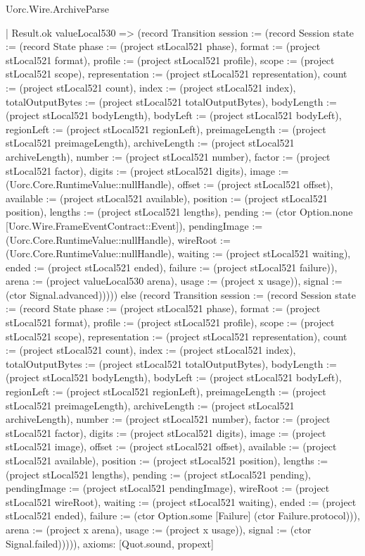 \begin{lexlean}{Uorc.Wire.ArchiveParse}
\begin{semanticmodule}
{      | Result.ok valueLocal530 => (record Transition {session := (record Session {state := (record State {phase := (project stLocal521 phase), format := (project stLocal521 format), profile := (project stLocal521 profile), scope := (project stLocal521 scope), representation := (project stLocal521 representation), count := (project stLocal521 count), index := (project stLocal521 index), totalOutputBytes := (project stLocal521 totalOutputBytes), bodyLength := (project stLocal521 bodyLength), bodyLeft := (project stLocal521 bodyLeft), regionLeft := (project stLocal521 regionLeft), preimageLength := (project stLocal521 preimageLength), archiveLength := (project stLocal521 archiveLength), number := (project stLocal521 number), factor := (project stLocal521 factor), digits := (project stLocal521 digits), image := (Uorc.Core.RuntimeValue::nullHandle), offset := (project stLocal521 offset), available := (project stLocal521 available), position := (project stLocal521 position), lengths := (project stLocal521 lengths), pending := (ctor Option.none [Uorc.Wire.FrameEventContract::Event]), pendingImage := (Uorc.Core.RuntimeValue::nullHandle), wireRoot := (Uorc.Core.RuntimeValue::nullHandle), waiting := (project stLocal521 waiting), ended := (project stLocal521 ended), failure := (project stLocal521 failure)}), arena := (project valueLocal530 arena), usage := (project x usage)}), signal := (ctor Signal.advanced)})))) else (record Transition {session := (record Session {state := (record State {phase := (project stLocal521 phase), format := (project stLocal521 format), profile := (project stLocal521 profile), scope := (project stLocal521 scope), representation := (project stLocal521 representation), count := (project stLocal521 count), index := (project stLocal521 index), totalOutputBytes := (project stLocal521 totalOutputBytes), bodyLength := (project stLocal521 bodyLength), bodyLeft := (project stLocal521 bodyLeft), regionLeft := (project stLocal521 regionLeft), preimageLength := (project stLocal521 preimageLength), archiveLength := (project stLocal521 archiveLength), number := (project stLocal521 number), factor := (project stLocal521 factor), digits := (project stLocal521 digits), image := (project stLocal521 image), offset := (project stLocal521 offset), available := (project stLocal521 available), position := (project stLocal521 position), lengths := (project stLocal521 lengths), pending := (project stLocal521 pending), pendingImage := (project stLocal521 pendingImage), wireRoot := (project stLocal521 wireRoot), waiting := (project stLocal521 waiting), ended := (project stLocal521 ended), failure := (ctor Option.some [Failure] (ctor Failure.protocol))}), arena := (project x arena), usage := (project x usage)}), signal := (ctor Signal.failed)})))),
  axioms: [Quot.sound, propext]
}


\end{semanticmodule}
\end{lexlean}

